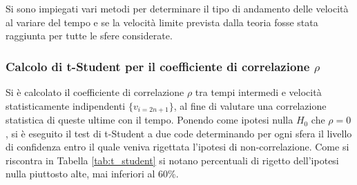\documentclass[a4paper,11pt,oneside]{article}
\begin{document}
Si sono impiegati vari metodi per determinare il tipo di andamento delle velocità al variare del tempo e se la velocità limite prevista dalla teoria fosse stata raggiunta per tutte le sfere considerate.

\subsubsection*{Calcolo di t-Student per il coefficiente di correlazione $\rho$}
Si è calcolato il coefficiente di correlazione $\rho$ tra tempi intermedi e velocità statisticamente indipendenti $\{ v_{i=2n+1}\}$, al fine di valutare una correlazione statistica di queste ultime con il tempo.
Ponendo come ipotesi nulla $H_{0}$ che $\rho=0$, si è eseguito il test di t-Student a due code determinando per ogni sfera il livello di confidenza entro il quale veniva rigettata l'ipotesi di non-correlazione. \newline
Come si riscontra in Tabella \ref{tab:t_student} si notano percentuali di rigetto dell'ipotesi nulla piuttosto alte, mai inferiori al 60\%.
\end{document}
